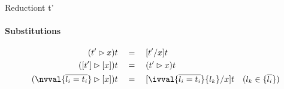 \begin{rules}{Reduction}{t \leadsto t'}
    \begin{minipage}{.475\linewidth}
    \end{minipage}
    \begin{minipage}{.49\linewidth}
    \end{minipage}
    \begin{minipage}{.25\linewidth}
    \end{minipage}
    \begin{minipage}{.36\linewidth}
    \end{minipage}
    \begin{minipage}{.50\linewidth}
    \end{minipage}
    \begin{minipage}{.40\linewidth}
    \end{minipage}
\end{rules}

\paragraph{\textnormal{\textbf{Substitutions}}}
\begin{align*}
    (t' \rhd x) t \quad&=\quad [t'/x]t \\%
    ([t'] \rhd [x])t \quad&=\quad (t' \rhd x)t\\%
    (\nvval{\overline{l_i=t_i}} \rhd [x]) t \quad&=\quad [\ivval{\overline{l_i=t_i}}{l_k}/x] t \quad (l_k \in \{\overline{l_i}\}) %
\end{align*}

